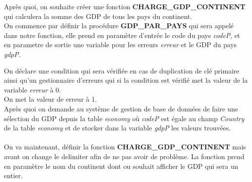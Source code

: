 \documentclass[11pt,a4paper]{article}
\begin{document}


Après quoi, on souhaite créer une fonction \textbf{CHARGE\_GDP\_CONTINENT} qui calculera la somme des GDP de tous les pays du continent.\\
On commence par définir la procédure \textbf{GDP\_PAR\_PAYS} qui sera appelé dans notre fonction, elle prend en paramètre d'entrée le code du pays \emph{codeP}, et en parametre de sortie une variable pour les erreurs \emph{erreur} et le GDP du pays \emph{gdpP}.



On déclare une condition qui sera vérifiée en cas de duplication de clé primaire ainsi qu'un gestionnaire d'erreurs qui si la condition est vérifié met la valeur de la variable \emph{erreur} à 0.\\
On met la valeur de erreur à 1.\\
Après quoi on demande au système de gestion de base de données de faire une sélection du GDP depuis la table \emph{economy} où \emph{codeP} est égale au champ \emph{Country} de la table \emph{economy} et de stocker dans la variable \emph{gdpP} les valeurs trouvées.\\\\
On va maintenant, définir la fonction \textbf{CHARGE\_GDP\_CONTINENT} mais avant on change le delimiter afin de ne pas avoir de problème. La fonction prend en paramètre le nom du continent dont ou souhait afficher le GDP qui sera un entier.


\end{document}
